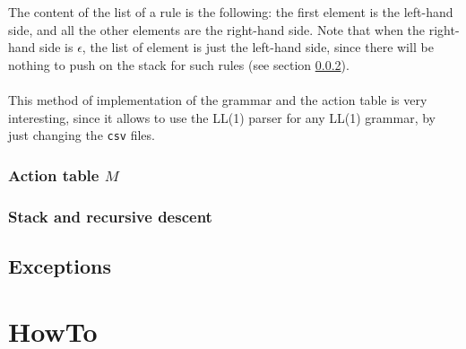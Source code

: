 \documentclass[letterpaper]{article}
\begin{document}
The content of the list
of a rule is the following: the first element is the left-hand side, and
all the other elements are the right-hand side.
Note that when the right-hand side is $\epsilon$, the list of element
is just the left-hand side,
since there will be nothing to push on the stack for such
rules (see section \ref{implstack}).

\paragraph{}

This method of implementation of the grammar and the action table is very
interesting, since it allows to use the LL(1) parser for any LL(1) grammar,
by just changing the \texttt{csv} files.

\subsubsection{Action table $M$}

\label{implactiontable}

\subsubsection{Stack and recursive descent}

\label{implstack}

\subsection{Exceptions}

\label{exceptionhandling}


\section{HowTo}

\label{howto}
\end{document}
